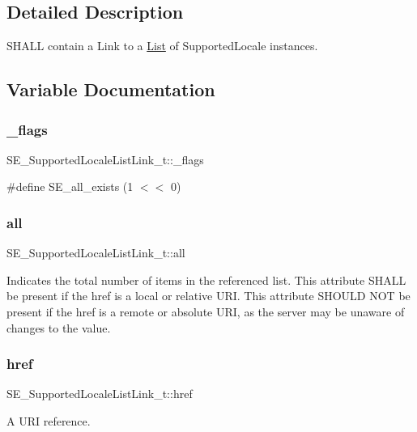 \subsection{Detailed Description}
S\+H\+A\+LL contain a Link to a \hyperlink{structList}{List} of Supported\+Locale instances. 

\subsection{Variable Documentation}
\mbox{\label{group__SupportedLocaleListLink_ga3834213a35449a295bdcda6fe2864998}} 
\subsubsection{\texorpdfstring{\+\_\+flags}{\_flags}}
{\footnotesize\ttfamily S\+E\+\_\+\+Supported\+Locale\+List\+Link\+\_\+t\+::\+\_\+flags}

\#define S\+E\+\_\+all\+\_\+exists (1 $<$$<$ 0) \mbox{\label{group__SupportedLocaleListLink_gab0c9ec69f7f20c53bc6b52d30fde20f1}} 
\subsubsection{\texorpdfstring{all}{all}}
{\footnotesize\ttfamily S\+E\+\_\+\+Supported\+Locale\+List\+Link\+\_\+t\+::all}

Indicates the total number of items in the referenced list. This attribute S\+H\+A\+LL be present if the href is a local or relative U\+RI. This attribute S\+H\+O\+U\+LD N\+OT be present if the href is a remote or absolute U\+RI, as the server may be unaware of changes to the value. \mbox{\label{group__SupportedLocaleListLink_ga14a01b4c6119f255705a6f237cb8052b}} 
\subsubsection{\texorpdfstring{href}{href}}
{\footnotesize\ttfamily S\+E\+\_\+\+Supported\+Locale\+List\+Link\+\_\+t\+::href}

A U\+RI reference. 